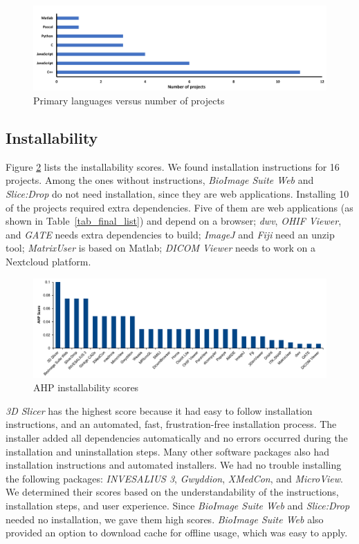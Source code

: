 \documentclass[11pt]{article}
\begin{document}
\begin{figure}[!ht]
\centering
\includegraphics[scale=0.5]{PrimaryLanguages.pdf}
\centering
\caption{\label{fig_language}Primary languages versus number of projects}
\end{figure}

\subsection{Installability} \label{sec_result_installability}

Figure \ref{fg_installability_scores} lists the installability scores.  We found
installation instructions for 16 projects. Among the ones without instructions,
\textit{BioImage Suite Web} and \textit{Slice:Drop} do not need installation,
since they are web applications. Installing 10 of the projects required extra
dependencies. Five of them are web applications (as shown in
Table~\ref{tab_final_list}) and depend on a browser; \textit{dwv}, \textit{OHIF
Viewer}, and \textit{GATE} needs extra dependencies to build; \textit{ImageJ}
and	\textit{Fiji} need an unzip tool; \textit{MatrixUser} is based on Matlab;
\textit{DICOM Viewer} needs to work on a Nextcloud platform.

\begin{figure}[!ht]
\includegraphics[scale=0.47]{installability_scores.pdf}
\caption{AHP installability scores}
\label{fg_installability_scores}
\end{figure}

\textit{3D Slicer} has the highest score because it had easy to follow
installation instructions, and an automated, fast, frustration-free installation
process. The installer added all dependencies automatically and no errors
occurred during the installation and uninstallation steps. Many other software
packages also had installation instructions and automated installers.  We had no
trouble installing the following packages: \textit{INVESALIUS 3},
\textit{Gwyddion}, \textit{XMedCon}, and \textit{MicroView}. We determined their
scores based on the understandability of the instructions, installation steps,
and user experience. Since \textit{BioImage Suite Web} and \textit{Slice:Drop}
needed no installation, we gave them high scores. \textit{BioImage Suite Web}
also provided an option to download cache for offline usage, which was easy to
apply.
\end{document}
